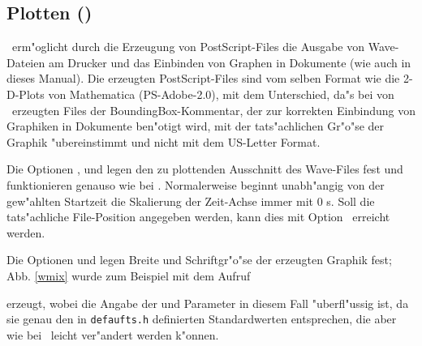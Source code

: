 \subsection{Plotten (\wplot)}



\wplot\ erm"oglicht durch die Erzeugung von PostScript-Files
die Ausgabe von Wave-Dateien am Drucker und das Einbinden von
Graphen in Dokumente (wie auch in dieses Manual).
Die erzeugten PostScript-Files sind vom selben Format wie die
2-D-Plots von Mathematica (PS-Adobe-2.0), mit dem Unterschied,
da"s bei von \wplot\ erzeugten Files der BoundingBox-Kommentar,
der zur korrekten Einbindung von Graphiken in Dokumente 
ben"otigt wird, mit der tats"achlichen Gr"o"se der Graphik
"ubereinstimmt und nicht mit dem US-Letter Format.

Die Optionen ,  und
 legen den zu plottenden Ausschnitt des
Wave-Files fest und funktionieren genauso wie bei \wcut.
Normalerweise beginnt unabh"angig von der gew"ahlten Startzeit
die Skalierung der Zeit-Achse immer mit 0 s. Soll die
tats"achliche File-Position angegeben werden, kann dies mit
Option \ erreicht werden.

Die Optionen  und  legen Breite
und Schriftgr"o"se der erzeugten Graphik fest; Abb. \ref{wmix}
wurde zum Beispiel mit dem Aufruf


\noindent erzeugt, wobei die Angabe der  und 
Parameter in diesem Fall "uberfl"ussig ist, da sie genau
den in {\tt defaufts.h} definierten Standardwerten entsprechen,
die aber wie bei \wfct\ leicht ver"andert werden k"onnen.



